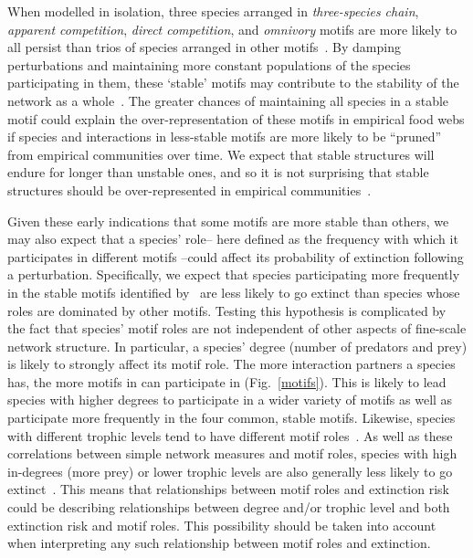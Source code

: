 \documentclass[12pt]{article}
\begin{document}
\begin{spacing}{2.0}
	When modelled in isolation, three species arranged in \emph{three-species chain}, \emph{apparent competition}, \emph{direct competition}, and \emph{omnivory} motifs are more likely to all persist than trios of species arranged in other motifs~\citep{Borrelli2015a}.
	By damping perturbations and maintaining more constant populations of the species participating in them, these `stable' motifs may contribute to the stability of the network as a whole~\citep{Borrelli2015a}. 
    The greater chances of maintaining all species in a stable motif could explain the over-representation of these motifs in empirical food webs if species and interactions in less-stable motifs are more likely to be ``pruned'' from empirical communities over time. We expect that stable structures will endure for longer than unstable ones, and so it is not surprising that stable structures should be over-represented in empirical communities~\citep{Borrelli2015}.


	Given these early indications that some motifs are more stable than others, we may also expect that a species' role-- here defined as the frequency with which it participates in different motifs --could affect its probability of extinction following a perturbation.
	Specifically, we expect that species participating more frequently in the stable motifs identified by~\citet{Borrelli2015a} are less likely to go extinct than species whose roles are dominated by other motifs.
	Testing this hypothesis is complicated by the fact that species' motif roles are not independent of other aspects of fine-scale network structure. 
    In particular, a species' degree (number of predators and prey) is likely to strongly affect its motif role.
    The more interaction partners a species has, the more motifs in can participate in (Fig.~\ref{motifs}).
    This is likely to lead species with higher degrees to participate in a wider variety of motifs as well as participate more frequently in the four common, stable motifs.
    Likewise, species with different trophic levels tend to have different motif roles~\citep{Cirtwill2018EcolLett}.
    As well as these correlations between simple network measures and motif roles, species with high in-degrees (more prey) or lower trophic levels are also generally less likely to go extinct~\citep{Cirtwill2018FoodWebs}.
    This means that relationships between motif roles and extinction risk could be describing relationships between degree and/or trophic level and both extinction risk and motif roles.
    This possibility should be taken into account when interpreting any such relationship between motif roles and extinction.
    

\end{spacing}
\end{document}

